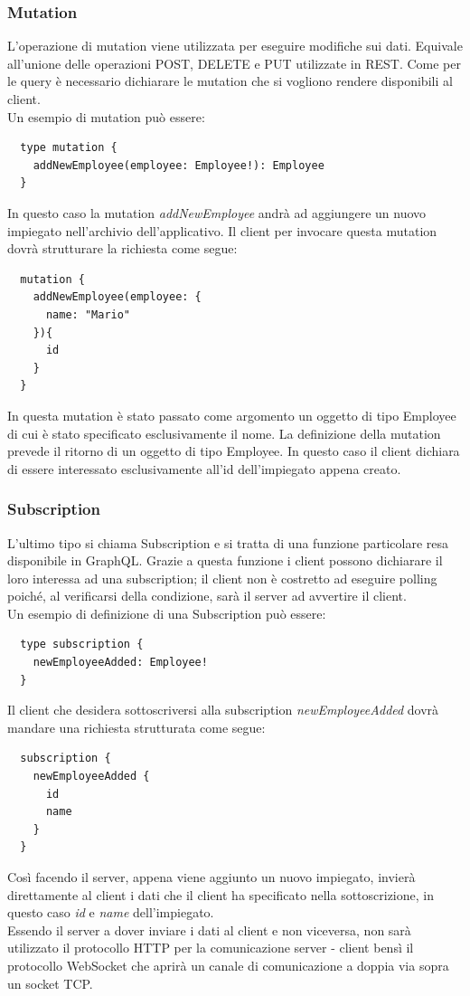 \subsubsection*{Mutation}
L'operazione di mutation viene utilizzata per eseguire modifiche sui dati. Equivale all'unione delle operazioni POST, DELETE e PUT utilizzate in REST. Come per le query è necessario dichiarare le mutation che si vogliono rendere disponibili al client.\\
Un esempio di mutation può essere:
\begin{verbatim}
  type mutation {
    addNewEmployee(employee: Employee!): Employee
  }
\end{verbatim}
In questo caso la mutation \textit{addNewEmployee} andrà ad aggiungere un nuovo impiegato nell'archivio dell'applicativo. Il client per invocare questa mutation dovrà strutturare la richiesta come segue:
\begin{verbatim}
  mutation {
    addNewEmployee(employee: {
      name: "Mario"
    }){
      id
    }
  }
\end{verbatim}
In questa mutation è stato passato come argomento un oggetto di tipo Employee di cui è stato specificato esclusivamente il nome. La definizione della mutation prevede il ritorno di un oggetto di tipo Employee. In questo caso il client dichiara di essere interessato esclusivamente all'id dell'impiegato appena creato.
\subsubsection*{Subscription}
L'ultimo tipo si chiama Subscription e si tratta di una funzione particolare resa disponibile in GraphQL. Grazie a questa funzione i client possono dichiarare il loro interessa ad una subscription; il client non è costretto ad eseguire polling poiché, al verificarsi della condizione, sarà il server ad avvertire il client.\\
Un esempio di definizione di una Subscription può essere:
\begin{verbatim}
  type subscription {
    newEmployeeAdded: Employee!
  }
\end{verbatim}
Il client che desidera sottoscriversi alla subscription \textit{newEmployeeAdded} dovrà mandare una richiesta strutturata come segue:
\begin{verbatim}
  subscription {
    newEmployeeAdded {
      id
      name
    }
  }
\end{verbatim}
Così facendo il server, appena viene aggiunto un nuovo impiegato, invierà direttamente al client i dati che il client ha specificato nella sottoscrizione, in questo caso \textit{id} e \textit{name} dell'impiegato.\\
Essendo il server a dover inviare i dati al client e non viceversa, non sarà utilizzato il protocollo HTTP per la comunicazione server - client bensì il protocollo WebSocket che aprirà un canale di comunicazione a doppia via sopra un socket TCP.\
